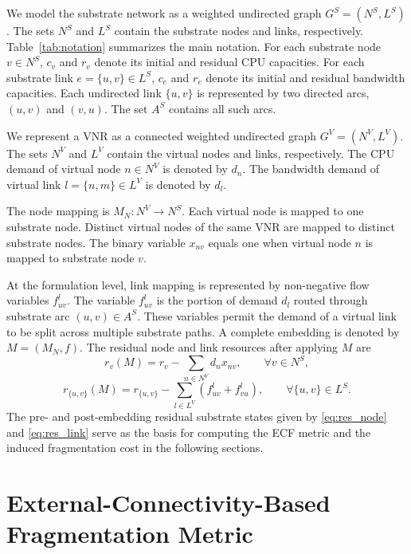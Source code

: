 \documentclass{ieeeaccess}
\newcommand{\ecf}{ECF}
\begin{document}
We model the substrate network as a weighted undirected graph $G^S=(N^S,L^S)$. The sets $N^S$ and
$L^S$ contain the substrate nodes and links, respectively. Table~\ref{tab:notation} summarizes the
main notation. For each substrate node $v\in N^S$, $c_v$ and $r_v$ denote its initial and residual
CPU capacities. For each substrate link $e=\{u,v\}\in L^S$, $c_e$ and $r_e$ denote its initial and
residual bandwidth capacities. Each undirected link $\{u,v\}$ is represented by two directed arcs,
$(u,v)$ and $(v,u)$. The set $A^S$ contains all such arcs.

We represent a VNR as a connected weighted undirected graph $G^V=(N^V,L^V)$. The sets $N^V$ and
$L^V$ contain the virtual nodes and links, respectively. The CPU demand of virtual node $n\in N^V$
is denoted by $d_n$. The bandwidth demand of virtual link $l=\{n,m\}\in L^V$ is denoted by $d_l$.

The node mapping is $M_N:N^V\rightarrow N^S$. Each virtual node is mapped to one substrate node.
Distinct virtual nodes of the same VNR are mapped to distinct substrate nodes. The binary variable
$x_{nv}$ equals one when virtual node $n$ is mapped to substrate node $v$.

At the formulation level, link mapping is represented by non-negative flow variables
$f_{uv}^l$. The variable $f_{uv}^l$ is the portion of demand $d_l$ routed through substrate arc
$(u,v)\in A^S$. These variables permit the demand of a virtual link to be split across multiple
substrate paths. A complete embedding is denoted by $M=(M_N,f)$. The residual node and link
resources after applying $M$ are
\begin{equation}
	r_v(M)
	=
	r_v-\sum_{n\in N^V}d_nx_{nv},
	\qquad \forall v\in N^S,
	\label{eq:res_node}
\end{equation}
\begin{equation}
	r_{\{u,v\}}(M)
	=
	r_{\{u,v\}}
	-
	\sum_{l\in L^V}
	\left(
	f_{uv}^l+f_{vu}^l
	\right),
	\qquad
	\forall\{u,v\}\in L^S.
	\label{eq:res_link}
\end{equation}
The pre- and post-embedding residual substrate states given by \eqref{eq:res_node} and
\eqref{eq:res_link} serve as the basis for computing
the \ecf{} metric and the induced fragmentation cost in the following sections.

\section{External-Connectivity-Based Fragmentation Metric}
\label{sec:metric_definition_of_resource_fragmentation}
\end{document}

